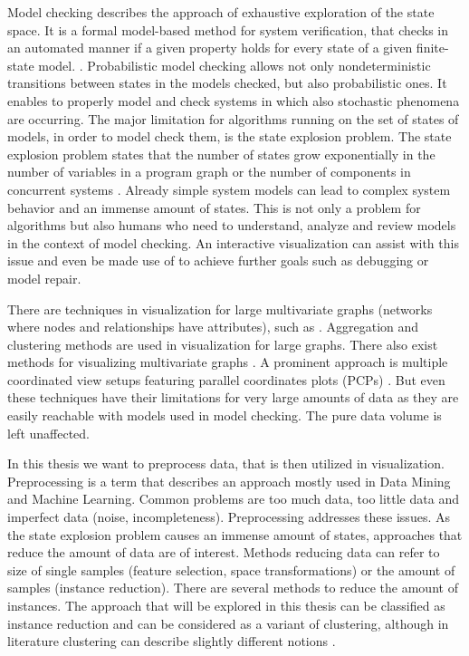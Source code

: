 \documentclass[preview]{standalone}
\begin{document}
Model checking describes the approach of exhaustive exploration of the state space. It is a formal model-based method for system verification, that checks in an automated manner if a given property holds for every state of a given finite-state model. \cite[chs. 1.1 and 1.2]{Baier2008}. Probabilistic model checking allows not only nondeterministic transitions between states in the models checked, but also probabilistic ones. It enables to properly model and check systems in which also stochastic phenomena are occurring. The major limitation for algorithms running on the set of states of models, in order to model check them, is the state explosion problem. The state explosion problem states that the number of states grow exponentially in the number of variables in a program graph or the number of components in concurrent systems \cite[ch. 2.3]{Baier2008}. Already simple system models can lead to complex system behavior and an immense amount of states. This is not only a problem for algorithms but also humans who need to understand, analyze and review models in the context of model checking. An interactive visualization can assist with this issue and even be made use of to achieve further goals such as debugging or model repair. 
 
There are techniques in visualization for large multivariate graphs (networks where nodes and relationships have attributes), such as \mdpsN. Aggregation and clustering methods are used in visualization for large graphs\cite{Goerke2009}. There also exist methods for visualizing multivariate graphs \cite{Kerren2014,Nobre2019}. A prominent approach is multiple coordinated view setups featuring parallel coordinates plots (PCPs) \cite{Johansson2016}. But even these techniques have their limitations for very large amounts of data as they are easily reachable with models used in model checking. The pure data volume is left unaffected.

In this thesis we want to preprocess data, that is then utilized in visualization. Preprocessing is a term that describes an approach mostly used in Data Mining and Machine Learning. Common problems are too much data, too little data and imperfect data (noise, incompleteness)\cite{Garcia2016}. Preprocessing addresses these issues. As the state explosion problem causes an immense amount of states, approaches that reduce the amount of data are of interest. Methods reducing data can refer to size of single samples (feature selection, space transformations) or the amount of samples (instance reduction). There are several methods to reduce the amount of instances. The approach that will be explored in this thesis can be classified as instance reduction and can be considered as a variant of clustering, although in literature clustering can describe slightly different notions \cite{Alasadi2017,Baskar2013}.
\end{document}
